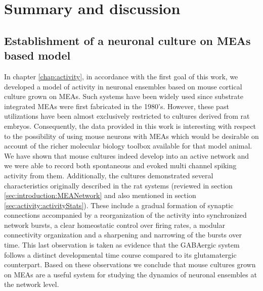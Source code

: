 \chapter{Summary and discussion}
\label{chap:Discussion}


\section{Establishment of a neuronal culture on MEAs based model}
In chapter \ref{chap:activity}, in accordance with the first goal of this work, we developed a model of activity in neuronal ensembles based on mouse cortical culture grown on MEAs. Such systems have been widely used since substrate integrated MEAs were first fabricated in the 1980's. However, these past utilizations have been almost exclusively restricted to cultures derived from rat embryos. Consequently, the data provided in this work is interesting with respect to the possibility of using mouse neurons with MEAs which would be desirable on account of the richer molecular biology toolbox available for that model animal. We have shown that mouse cultures indeed develop into an active network and we were able to record both spontaneous and evoked multi channel spiking activity from them. Additionally, the cultures demonstrated several characteristics originally described in the rat systems (reviewed in section \ref{sec:introduction:MEANetwork} and also mentioned in section \ref{sec:activity:activityStats}). These include a gradual formation of synaptic connections accompanied by a reorganization of the activity into synchronized network bursts, a clear homeostatic control over firing rates, a modular connectivity organization and a sharpening and narrowing of the bursts over time. This last observation is taken as evidence that the GABAergic system follows a distinct developmental time course compared to its glutamatergic counterpart. Based on these observations we conclude that mouse cultures grown on MEAs are a useful system for studying the dynamics of neuronal ensembles at the network level.

